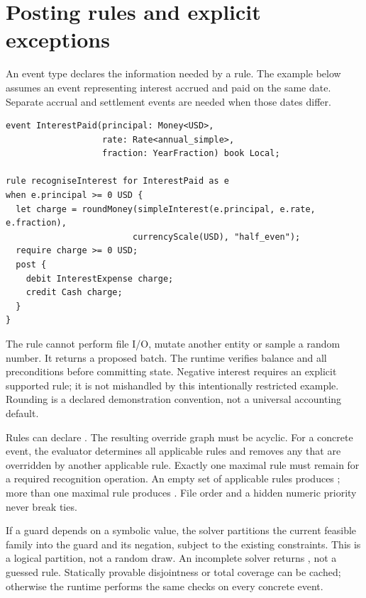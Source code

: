 \begin{minipage}{\linewidth}
\section{Posting rules and explicit exceptions}

An event type declares the information needed by a rule. The example below
assumes an event representing interest accrued and paid on the same date.
Separate accrual and settlement events are needed when those dates differ.

\begin{lstlisting}
event InterestPaid(principal: Money<USD>,
                   rate: Rate<annual_simple>,
                   fraction: YearFraction) book Local;

rule recogniseInterest for InterestPaid as e
when e.principal >= 0 USD {
  let charge = roundMoney(simpleInterest(e.principal, e.rate, e.fraction),
                         currencyScale(USD), "half_even");
  require charge >= 0 USD;
  post {
    debit InterestExpense charge;
    credit Cash charge;
  }
}
\end{lstlisting}
\end{minipage}

The rule cannot perform file I/O, mutate another entity or sample a random
number. It returns a proposed batch. The runtime verifies balance and all
preconditions before committing state. Negative interest requires an explicit
supported rule; it is not mishandled by this intentionally restricted example.
Rounding is a declared demonstration convention, not a universal accounting
default.

Rules can declare . The resulting override graph
must be acyclic. For a concrete event, the evaluator determines all applicable
rules and removes any that are overridden by another applicable rule. Exactly
one maximal rule must remain for a required recognition operation. An empty
set of applicable rules produces ; more than one
maximal rule produces
. File order and a hidden numeric priority never break ties.

If a guard depends on a symbolic value, the solver partitions the current
feasible family into the guard and its negation, subject to the existing
constraints. This is a logical partition, not a random draw. An incomplete
solver returns , not a guessed rule. Statically
provable disjointness or total coverage can be cached; otherwise the runtime
performs the same checks on every concrete event.

